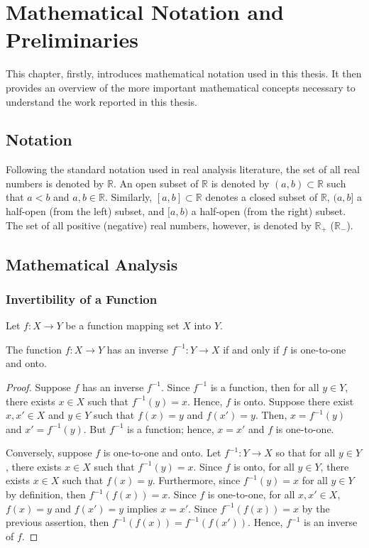 \chapter{Mathematical Notation and Preliminaries} %
\label{cha:notation}

This chapter, firstly, introduces mathematical notation used in this thesis. It then provides an overview of the more important mathematical concepts necessary to understand the work reported in this thesis.

\section{Notation} %
\label{sec:notation_notation}
Following the standard notation used in real analysis literature, the set of all real numbers is denoted by $\mathbb{R}$. An open subset of $\mathbb{R}$ is denoted by $(a,b)\subset \mathbb{R}$ such that $a < b$ and $a,b\in\mathbb{R}$. Similarly, $[a,b]\subset\mathbb{R}$ denotes a closed subset of $\mathbb{R}$, $(a,b]$ a half-open (from the left) subset, and $[a,b)$ a half-open (from the right) subset. The set of all positive (negative) real numbers, however, is denoted by $\mathbb{R}_+$ ($\mathbb{R}_-$).

\section{Mathematical Analysis} %
\label{sec:mathematical_analysis_notation}

\subsection{Invertibility of a Function} %
\label{sub:invertibility_of_a_function_notation}
Let $f: X\to Y$ be a function mapping set $X$ into $Y$.
\begin{thm}
\label{thm:inverse_of_a_function_notation}
The function $f:X\to Y$ has an inverse $f^{-1}: Y\to X$ if and only if $f$ is one-to-one and onto.
\end{thm}
\begin{proof}
Suppose $f$ has an inverse $f^{-1}$. Since $f^{-1}$ is a function, then for all $y\in Y$, there exists $x\in X$ such that $f^{-1}(y) = x$. Hence, $f$ is onto. Suppose there exist $x,x'\in X$ and $y\in Y$ such that $f(x) = y$ and $f(x') = y$. Then, $x = f^{-1}(y)$ and $x' = f^{-1}(y)$. But $f^{-1}$ is a function; hence, $x = x'$ and $f$ is one-to-one.

Conversely, suppose $f$ is one-to-one and onto. Let $f^{-1}: Y\to X$ so that for all $y\in Y$, there exists $x\in X$ such that $f^{-1}(y) = x$. Since $f$ is onto, for all $y\in Y$, there exists $x\in X$ such that $f(x) = y$. Furthermore, since $f^{-1}(y) = x$ for all $y\in Y$ by definition, then $f^{-1}(f(x)) = x$. Since $f$ is one-to-one, for all $x,x'\in X$, $f(x) = y$ and $f(x') = y$ implies $x = x'$. Since $f^{-1}(f(x)) = x$ by the previous assertion, then $f^{-1}(f(x)) = f^{-1}(f(x'))$. Hence, $f^{-1}$ is an inverse of $f$.
\end{proof}

